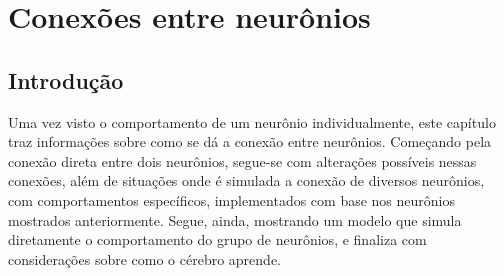 \chapter{Conexões entre neurônios}\label{cap:conexoes}
\section{Introdução}\label{sec:conexoes_intro}
Uma vez visto o comportamento de um neurônio individualmente, este capítulo traz informações sobre como se dá a conexão entre neurônios. Começando pela conexão direta entre dois neurônios, segue-se com alterações possíveis nessas conexões, além de situações onde é simulada a conexão de diversos neurônios, com comportamentos específicos, implementados com base nos neurônios mostrados anteriormente. Segue, ainda, mostrando um modelo que simula diretamente o comportamento do grupo de neurônios, e finaliza com considerações sobre como o cérebro aprende.


